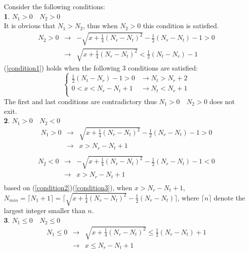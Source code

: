 \documentclass[12pt,a4paper,final]{article}
\begin{document}
\begin{spacing}{2.5}
Consider the following conditions:\\
\textbf{1}. $N_{1}>0\quad N_{2}>0$\\
It is obvious that $N_{1}>N_{2}$, thus when $N_{2}>0$ this condition is satisfied.
\begin{eqnarray}
\nonumber
N_{2}>0 &\rightarrow & -\sqrt{x+\frac{1}{4}(N_{r}-N_{t})^{2}}-\frac{1}{2}(N_{r}-N_{t})-1>0\\
&\rightarrow & \sqrt{x+\frac{1}{4}(N_{r}-N_{t})^{2}}<\frac{1}{2}(N_{t}-N_{r})-1 \label{condition1}
\end{eqnarray}
(\ref{condition1}) holds when the following 3 conditions are satisfied:
\begin{displaymath}
\left\{\begin{array}{ll}
\frac{1}{2}(N_{t}-N_{r})-1>0&\rightarrow N_{t}>N_{r}+2\\
0<x< N_{r}-N_{t}+1&\rightarrow N_{t}<N_{r}+1\\
\end{array}\right.
\end{displaymath}
The first and last conditions are contradictory thus $N_{1}>0\quad N_{2}>0$ does not exit.\\
\textbf{2}. $N_{1}>0\quad N_{2}<0$\\
\begin{eqnarray}
\nonumber
N_{1}>0&\rightarrow & \sqrt{x+\frac{1}{4}(N_{r}-N_{t})^{2}}-\frac{1}{2}(N_{r}-N_{t})-1>0\\
\nonumber
&\rightarrow &x>N_{r}-N_{t}+1\\ \label{condition2}
\end{eqnarray}
\begin{eqnarray}
\nonumber
N_{2}<0&\rightarrow & -\sqrt{x+\frac{1}{4}(N_{r}-N_{t})^{2}}-\frac{1}{2}(N_{r}-N_{t})-1<0\\
\nonumber
&\rightarrow &x>N_{r}-N_{t}+1\\ \label{condition3}
\end{eqnarray}
based on (\ref{condition2})(\ref{condition3}), when $x>N_{r}-N_{t}+1$, $N_{min}=\lceil N_{1}+1\rceil= \lceil \sqrt{x+\frac{1}{4}(N_{r}-N_{t})^{2}}-\frac{1}{2}(N_{r}-N_{t})\rceil$, where $\lceil n\rceil$ denote the largest integer smaller than $n$.\\
\textbf{3}. $N_{1}\leq 0\quad N_{2}\leq 0$\\
\begin{eqnarray}
\nonumber
N_{1}\leq 0&\rightarrow & \sqrt{x+\frac{1}{4}(N_{r}-N_{t})^{2}}\leq \frac{1}{2}(N_{r}-N_{t})+1\\
\nonumber
&\rightarrow &x\leq N_{r}-N_{t}+1\\ \label{condition4}

\end{eqnarray}
\end{spacing}
\end{document}
